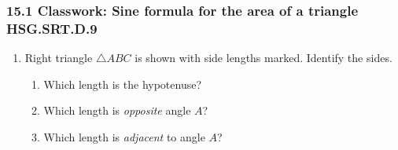 

\fancyhead[LE]{\thepage}



\subsubsection*{15.1 Classwork: Sine formula for the area of a triangle \hfill HSG.SRT.D.9} %
\begin{enumerate}
\item Right triangle $\triangle ABC$ is shown with side lengths marked. Identify the sides. \vspace{0.5cm}
\begin{multicols}{2}
  \begin{enumerate}
    \item Which length is the hypotenuse?
    \item Which length is \emph{opposite} angle $A$?
    \item Which length is \emph{adjacent} to angle $A$?  \vspace{1cm}
  \end{enumerate}
\begin{flushright}
\end{flushright}
\end{multicols}


\end{enumerate}
